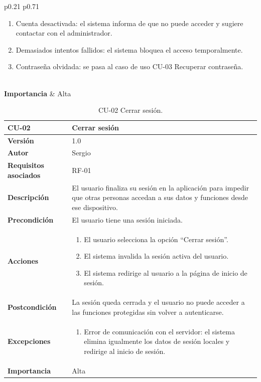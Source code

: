 \begin{table}[p]
\begin{tabularx}{\linewidth}{ p{0.21\columnwidth} p{0.71\columnwidth} }
\begin{enumerate}
			\item Cuenta desactivada: el sistema informa de que no puede acceder y sugiere contactar con el administrador.
			\item Demasiados intentos fallidos: el sistema bloquea el acceso temporalmente.
			\item Contraseña olvidada: se pasa al caso de uso CU-03 Recuperar contraseña.
		\end{enumerate}\\
		\textbf{Importancia}          & Alta \\
		\bottomrule
	\end{tabularx}
	\caption{CU-01 Iniciar sesión.}
\end{table}


\begin{table}[p]
	\centering
	\begin{tabularx}{\linewidth}{ p{} p{} }
		\toprule
		\textbf{CU-02}    & \textbf{Cerrar sesión}\\
		\toprule
		\textbf{Versión}              & 1.0    \\
		\textbf{Autor}                & Sergio \\
		\textbf{Requisitos asociados} & RF-01 \\
		\textbf{Descripción}          & El usuario finaliza su sesión en la aplicación para impedir que otras personas accedan a sus datos y funciones desde ese dispositivo. \\
		\textbf{Precondición}         & El usuario tiene una sesión iniciada. \\
		\textbf{Acciones}             &
		\begin{enumerate}
			\def\labelenumi{\arabic{enumi}.}
			\tightlist
			\item El usuario selecciona la opción ``Cerrar sesión''.
			\item El sistema invalida la sesión activa del usuario.
			\item El sistema redirige al usuario a la página de inicio de sesión.
		\end{enumerate}\\
		\textbf{Postcondición}        & La sesión queda cerrada y el usuario no puede acceder a las funciones protegidas sin volver a autenticarse. \\
		\textbf{Excepciones}          &
		\begin{enumerate}
			\def\labelenumi{\arabic{enumi}.}
			\tightlist
			\item Error de comunicación con el servidor: el sistema elimina igualmente los datos de sesión locales y redirige al inicio de sesión.
		\end{enumerate}\\
		\textbf{Importancia}          & Alta \\
		\bottomrule
	\end{tabularx}
	\caption{CU-02 Cerrar sesión.}
\end{table}

